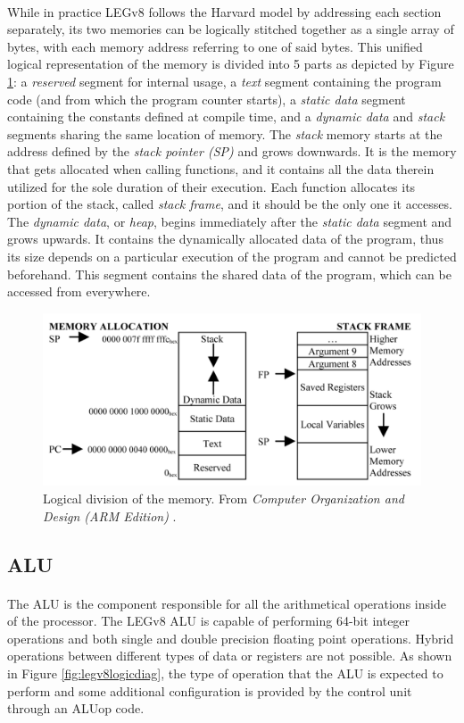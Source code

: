 \paragraph{}
While in practice LEGv8 follows the Harvard model by addressing each section separately, its two memories can be logically stitched together as a single array of bytes, with each memory address referring to one of said bytes. This unified logical representation of the memory is divided into 5 parts as depicted by Figure \ref{fig:legv8memdiag}: a \emph{reserved} segment for internal usage, a \emph{text} segment containing the program code (and from which the program counter starts), a \emph{static data} segment containing the constants defined at compile time, and a \emph{dynamic data} and \emph{stack} segments sharing the same location of memory. The \emph{stack} memory starts at the address defined by the \emph{stack pointer (SP)} and grows downwards. It is the memory that gets allocated when calling functions, and it contains all the data therein utilized for the sole duration of their execution. Each function allocates its portion of the stack, called \emph{stack frame}, and it should be the only one it accesses. The \emph{dynamic data}, or \emph{heap}, begins immediately after the \emph{static data} segment and grows upwards. It contains the dynamically allocated data of the program, thus its size depends on a particular execution of the program and cannot be predicted beforehand. This segment contains the shared data of the program, which can be accessed from everywhere.
\begin{figure}[H]
	\centering
	\includegraphics[width=.8\textwidth]{img/main_memory_layout.png}
	\caption{Logical division of the memory. From \emph{Computer Organization and Design (ARM Edition)} \cite{patterson2016computer}.}
 \label{fig:legv8memdiag}
\end{figure}
\subsection{ALU}
\paragraph{}
The ALU is the component responsible for all the arithmetical operations inside of the processor. The LEGv8 ALU is capable of performing 64-bit integer operations and both single and double precision floating point operations. Hybrid operations between different types of data or registers are not possible. As shown in Figure \ref{fig:legv8logicdiag}, the type of operation that the ALU is expected to perform and some additional configuration is provided by the control unit through an ALUop code.
